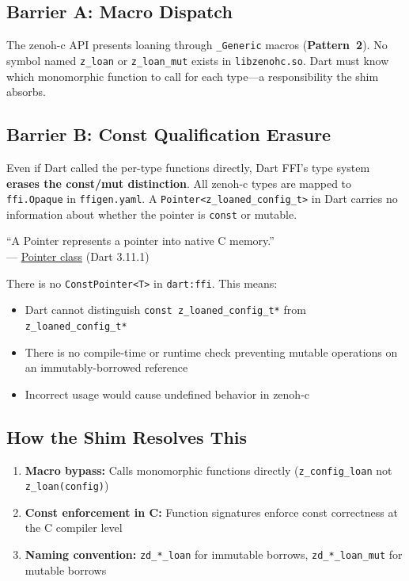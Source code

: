 \documentclass[11pt,a4paper]{article}
\newcommand{\code}[1]{\texttt{#1}}
\newcommand{\file}[1]{\texttt{#1}}
\newcommand{\fn}[1]{\texttt{#1}}
\newcommand{\pattern}[1]{\textbf{Pattern~#1}}
\begin{document}
\subsection{Barrier A: Macro Dispatch}

The zenoh-c API presents loaning through \code{\_Generic} macros
(\pattern{2}). No symbol named \code{z\_loan} or \code{z\_loan\_mut}
exists in \file{libzenohc.so}. Dart must know which monomorphic function
to call for each type---a responsibility the shim absorbs.

\subsection{Barrier B: Const Qualification Erasure}

Even if Dart called the per-type functions directly, Dart FFI's type
system \textbf{erases the const/mut distinction}. All zenoh-c types are
mapped to \code{ffi.Opaque} in \file{ffigen.yaml}. A
\code{Pointer<z\_loaned\_config\_t>} in Dart carries no information
about whether the pointer is \code{const} or mutable.

\begin{quotebox}
``A Pointer represents a pointer into native C memory.''\\
--- \href{https://api.dart.dev/stable/latest/dart-ffi/Pointer-class.html}{Pointer class} (Dart 3.11.1)
\end{quotebox}

There is no \code{ConstPointer<T>} in \code{dart:ffi}. This means:

\begin{itemize}
  \item Dart cannot distinguish \code{const z\_loaned\_config\_t*} from
        \code{z\_loaned\_config\_t*}
  \item There is no compile-time or runtime check preventing mutable
        operations on an immutably-borrowed reference
  \item Incorrect usage would cause undefined behavior in zenoh-c
\end{itemize}

\subsection{How the Shim Resolves This}

\begin{enumerate}
  \item \textbf{Macro bypass:} Calls monomorphic functions directly
        (\fn{z\_config\_loan} not \code{z\_loan(\allowbreak{}config)})
  \item \textbf{Const enforcement in C:} Function signatures enforce
        const correctness at the C compiler level
  \item \textbf{Naming convention:} \code{zd\_*\_loan} for immutable
        borrows, \code{zd\_*\_loan\_mut} for mutable borrows
\end{enumerate}
\end{document}
